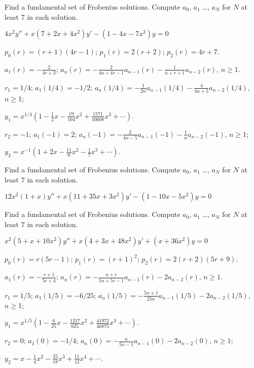 \documentclass{ximera}
\begin{document}
\begin{problem}\label{exer:7.5.4}
Find a fundamental
set
of Frobenius solutions. Compute $a_0$, $a_{1}$ \dots, $a_N$ for $N$ at
least
$7$ in
each solution.

$4x^2y''+x(7+2x+4x^2)y'-(1-4x-7x^2)y=0$

\begin{solution}
    $p_0(r)=(r+1)(4r-1)$;
$p_1(r)=2(r+2)$;
$p_2(r)=4r+7$.

$a_1(r)=-\frac{2}{ 4r+3}$;
$a_n(r)=-\frac{2}{ 4n+4r-1}a_{n-1}(r)-\frac{1}{ n+r+1}a_{n-2}(r)$,
$n\geq 1$.

$r_1=1/4$;
$a_1(1/4)=-1/2$;
$a_n(1/4)=-\frac{1}{ 2n}a_{n-1}(1/4)-\frac{4}{ 4n+5}a_{n-2}(1/4)$,
$n\geq $1;


$y_1=x^{1/4}\left(1-\frac{1}{2}x-\frac{19}{104}x^2+
\frac{1571}{10608}x^3+\cdots\right)$.

$r_2=-1$;
$a_1(-1)=2$;
$a_n(-1)=-\frac{2}{ 4n-5}a_{n-1}(-1)-\frac{1}{ n}a_{n-2}(-1)$,
$n\geq 1$;

$y_2=x^{-1}\left(1+2x-\frac{11}{6}x^2-\frac{1}{7}x^3+\cdots\right)$.
\end{solution}

\end{problem}

\begin{problem}\label{exer:7.5.5}
Find a fundamental
set
of Frobenius solutions. Compute $a_0$, $a_{1}$ \dots, $a_N$ for $N$ at
least
$7$ in
each solution.

$12x^2(1+x)y''+x(11+35x+3x^2)y'-(1-10x-5x^2)y=0$

\end{problem}

\begin{problem}\label{exer:7.5.6}
Find a fundamental
set
of Frobenius solutions. Compute $a_0$, $a_{1}$ \dots, $a_N$ for $N$ at
least
$7$ in
each solution.

 $x^2(5+x+10x^2)y''+x(4+3x+48x^2)y'+(x+36x^2)y=0$

 \begin{solution}
     $p_0(r)=r(5r-1)$;
$p_1(r)=(r+1)^2$;
$p_2(r)=2(r+2)(5r+9)$.


$a_1(r)=-\frac{r+1}{5r+4}$;
$a_n(r)=-\frac{n+r}{5n+5r-1}a_{n-1}(r)-2a_{n-2}(r)$,
$n\geq 1$.

$r_1=1/5$;
$a_1(1/5)=-6/25$;
$a_n(1/5)=-\frac{5n+1}{25n}a_{n-1}(1/5)-2a_{n-2}(1/5)$,
$n\geq $1;

$y_1=x^{1/5}\left(1-\frac{6}{25}x-\frac{1217}{625}x^2+
\frac{41972}{46875}x^3
+\cdots\right)$.


$r_2=0$;
$a_1(0)=-1/4$;
$a_n(0)=-\frac{n}{5n-1}a_{n-1}(0)-2a_{n-2}(0)$,
$n\geq 1$;

$y_2=x-\frac{1}{4}x^2-\frac{35}{18}x^3+\frac{11}{12}x^4+\cdots$.
 \end{solution}
 \end{problem}
\end{document}
